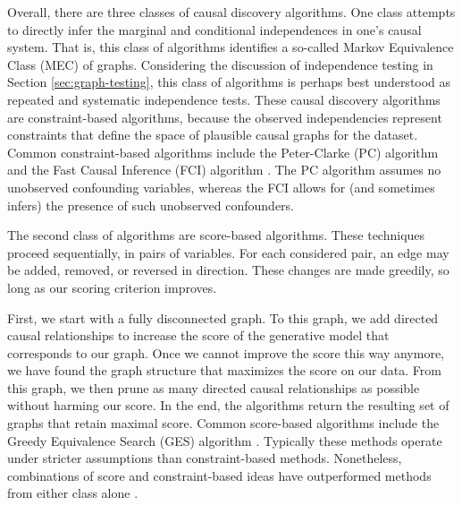 Overall, there are three classes of causal discovery algorithms.
One class attempts to directly infer the marginal and conditional independences in one's causal system.
That is, this class of algorithms identifies a so-called Markov Equivalence Class (MEC) of graphs.
Considering the discussion of independence testing in Section \ref{sec:graph-testing}, this class of algorithms is perhaps best understood as repeated and systematic independence tests.
These causal discovery algorithms are constraint-based algorithms, because the observed independencies represent constraints that define the space of plausible causal graphs for the dataset.
Common constraint-based algorithms include the Peter-Clarke (PC) algorithm and the Fast Causal Inference (FCI) algorithm \citep{glymour_2001_causation}.
The PC algorithm assumes no unobserved confounding variables, whereas the FCI allows for (and sometimes infers) the presence of such unobserved confounders.

The second class of algorithms are score-based algorithms.
These techniques proceed sequentially, in pairs of variables.
For each considered pair, an edge may be added, removed, or reversed in direction.
These changes are made greedily, so long as our scoring criterion improves.

First, we start with a fully disconnected graph.
To this graph, we add directed causal relationships to increase the score of the generative model that corresponds to our graph.
Once we cannot improve the score this way anymore, we have found the graph structure that maximizes the score on our data.
From this graph, we then prune as many directed causal relationships as possible without harming our score.
In the end, the algorithms return the resulting set of graphs that retain maximal score.
Common score-based algorithms include the Greedy Equivalence Search (GES) algorithm \citep{chickering_2002_optimal}.
Typically these methods operate under stricter assumptions than constraint-based methods.
Nonetheless, combinations of score and constraint-based ideas have outperformed methods from either class alone \citep{glymour_2019_review}.

